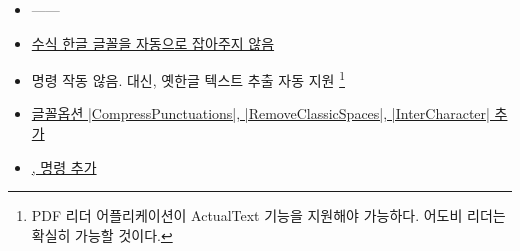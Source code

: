 \documentclass[a4paper]{article}
\begin{document}
\begin{itemize}
  \item[v2.0] ------
  \item \hyperref[sec:mathhangul]{수식 한글 글꼴을 자동으로 잡아주지 않음}
  \item {} 명령 작동 않음. 대신, 옛한글 텍스트 추출 자동 지원%
    \footnote{%
      PDF 리더 어플리케이션이 ActualText 기능을 지원해야 가능하다.
    어도비 리더는 확실히 가능할 것이다. }
  \item \hyperref[sec:fontoption]{글꼴옵션 |CompressPunctuations|,
    |RemoveClassicSpaces|, |InterCharacter| 추가}
  \item \hyperref[sec:break]{,
     명령 추가}
\end{itemize}
\end{document}
